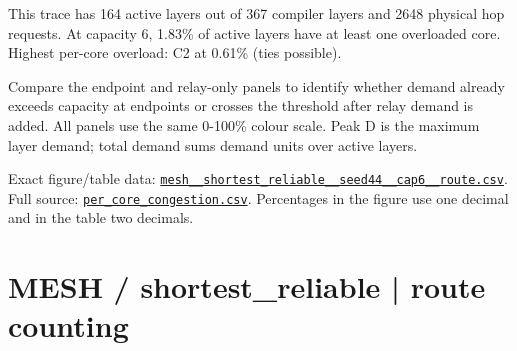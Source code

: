 \documentclass[10pt,a4paper]{article}
\begin{document}
This trace has 164 active layers out of 367 compiler layers and 2648 physical hop requests. At capacity 6, 1.83\% of active layers have at least one overloaded core. Highest per-core overload: C2 at 0.61\% (ties possible).\par
Compare the endpoint and relay-only panels to identify whether demand already exceeds capacity at endpoints or crosses the threshold after relay demand is added. All panels use the same 0-100\% colour scale. Peak D is the maximum layer demand; total demand sums demand units over active layers.\par
Exact figure/table data: \href{\detokenize{file:///home/dhruv-pansuriya/Documents/BTP/Compiler-Driven-ACE/output/pdf/qaoa_methods_congestion/tables/mesh__shortest_reliable__seed44__cap6__route.csv}}{\nolinkurl{mesh__shortest_reliable__seed44__cap6__route.csv}}. Full source: \href{\detokenize{file:///home/dhruv-pansuriya/Documents/BTP/Compiler-Driven-ACE/results/qaoa_2seed_2026-10-26/congestion/per_core_congestion.csv}}{\nolinkurl{per_core_congestion.csv}}. Percentages in the figure use one decimal and in the table two decimals.\par
\clearpage
\section*{MESH / shortest\_reliable | route counting}
\end{document}
